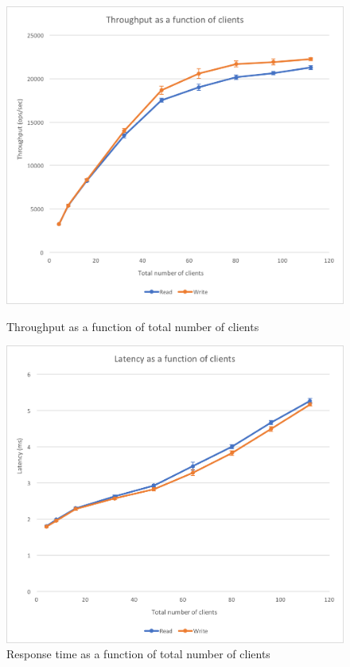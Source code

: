 \documentclass[11pt,a4paper]{article}
\begin{document}
\begin{figure}[!h]
    \centering
    \begin{minipage}[b]{.45\textwidth}
        \centering
        \includegraphics[width=\textwidth]{processing/graphics/bench_clients_through-clients.png}
        \caption{Throughput as a function of total number of clients}
        \label{png::bench_clients_through-clients}
    \end{minipage}
    \qquad
    \begin{minipage}[b]{.45\textwidth}
        \centering
        \includegraphics[width=\textwidth]{processing/graphics/bench_clients_latency-clients.png}
        \caption{Response time as a function of total number of clients}
        \label{png::bench_clients_latency-clients}
    \end{minipage}
\end{figure}
\end{document}
